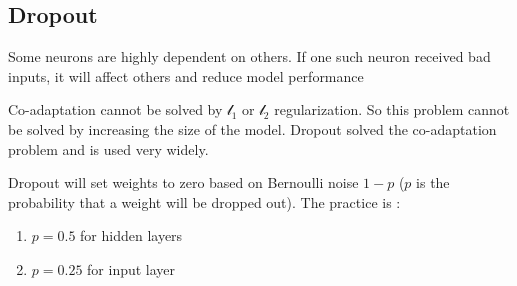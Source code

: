 \subsection{Dropout}

\begin{definition}[Co-adaptation]
    Some neurons are highly dependent on others. If one such neuron received bad inputs, it will affect others and reduce model performance    
\end{definition}

Co-adaptation cannot be solved by $\mathcal{l}_1$ or $\mathcal{l}_2$ regularization. So this problem cannot be solved by increasing the size of the model. Dropout solved the co-adaptation problem and is used very widely.

Dropout will set weights to zero based on Bernoulli noise $1-p$ ($p$ is the probability that a weight will be dropped out). The practice is :
\begin{enumerate}
    \item $p=0.5$ for hidden layers
    \item $p= 0.25$ for input layer
\end{enumerate}


